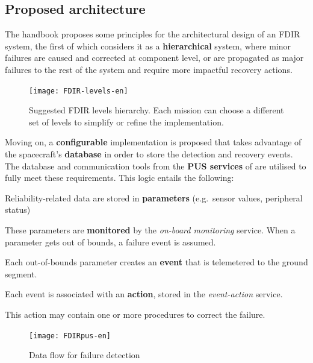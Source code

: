 \documentclass[a4paper,nobib,final]{tufte-book}
\begin{document}
\egroup
\subsection{Proposed architecture}

The handbook proposes some principles for the architectural design of an \acs{FDIR} system, the first of which considers it as a \textbf{hierarchical} system, where minor failures are caused and corrected at component level, or are propagated as major failures to the rest of the system and require more impactful recovery actions.

\begin{figure}
	\texttt{[image: FDIR-levels-en]}
	\caption[Suggested FDIR levels hierarchy]{Suggested FDIR levels hierarchy. Each mission can choose a different set of levels to simplify or refine the implementation.}
	\label{fig:FDIR-levels}
\end{figure}

Moving on, a \textbf{configurable} implementation is proposed that takes advantage of the spacecraft's \textbf{database} in order to store the detection and recovery events. The database and communication tools from the \textbf{\acs{PUS} services} of  are utilised to fully meet these requirements. This logic entails the following:
\begin{compactenum}
	\item Reliability-related data are stored in \textbf{parameters} (e.g.\ sensor values, peripheral status)
	\item These parameters are \textbf{monitored} by the \emph{on-board monitoring} service. When a parameter gets out of bounds, a failure event is assumed.
	\item Each out-of-bounds parameter creates an \textbf{event} that is telemetered to the ground segment.
	\item Each event is associated with an \textbf{action}, stored in the \emph{event-action} service.
	\item This action may contain one or more procedures to correct the failure.
\end{compactenum}

\begin{figure}[h]
	\texttt{[image: FDIRpus-en]}
	\caption{Data flow for failure detection}
	\label{fig:fdirpus}
\end{figure}
\end{document}
